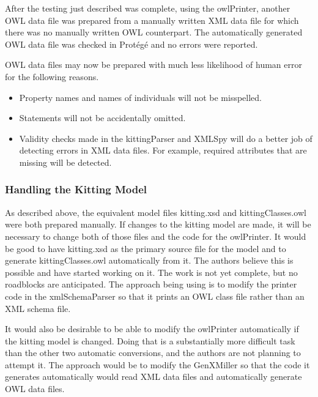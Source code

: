 After the testing just described was complete, using the owlPrinter,
another OWL data file was prepared from a manually written XML data file
for which there was no manually written OWL counterpart. The automatically
generated OWL data file was checked in  Prot\'{e}g\'{e} and no errors were reported.

OWL data files
may now be prepared with much less likelihood of human error for the following
reasons.
\begin{itemize}

\item Property names and names of individuals will not be misspelled.

\item Statements will not be accidentally omitted.

\item Validity checks made in the kittingParser and XMLSpy will do a
  better job of detecting errors in XML data files. For example, required
  attributes that are missing will be detected.

\end{itemize}

\subsubsection{Handling the Kitting Model}
As described above, the equivalent model files kitting.xsd and
kittingClasses.owl were both prepared manually. If changes to the kitting
model are made, it will be necessary to change both of those files and the
code for the owlPrinter. It would be good to have kitting.xsd as the
primary source file for the model and to generate kittingClasses.owl
automatically from it. The authors believe this is possible and have
started working on it. The work is not yet complete, but no roadblocks are
anticipated. The approach being using is to modify the printer code in the
xmlSchemaParser so that it prints an OWL class file rather than an XML
schema file.

It would also be desirable to be able to modify the owlPrinter
automatically if the kitting model is changed. Doing that is a
substantially more difficult task than the other two automatic conversions,
and the authors are not planning to attempt it. The approach would be to
modify the GenXMiller so that the code it generates automatically would
read XML data files and automatically generate OWL data files.

